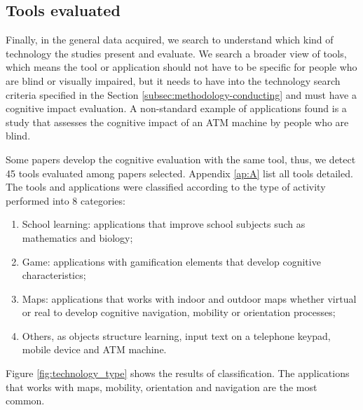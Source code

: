 \subsection{Tools evaluated}
\label{subsec:results-tools}

Finally, in the general data acquired, we search to understand which kind of technology the studies present and evaluate. We search a broader view of tools, which means the tool or application should not have to be specific for people who are blind or visually impaired, but it needs to have into the technology search criteria specified in the Section \ref{subsec:methodology-conducting} and must have a cognitive impact evaluation. A non-standard example of applications found is a study that assesses the cognitive impact of an ATM machine by people who are blind. 

Some papers develop the cognitive evaluation with the same tool, thus, we detect 45 tools evaluated among papers selected. Appendix \ref{ap:A} list all tools detailed. The tools and applications were classified according to the type of activity performed into 8 categories: 
        \begin{enumerate}
            \item School learning: applications that improve school subjects such as mathematics and biology;
            \item Game: applications with gamification elements that develop cognitive characteristics;
            \item Maps: applications that works with indoor and outdoor maps whether virtual or real to develop cognitive navigation, mobility or orientation processes;
            \item Others, as objects structure learning, input text on a telephone keypad, mobile device and ATM machine.
        \end{enumerate}

Figure \ref{fig:technology_type} shows the results of classification. The applications that works with maps, mobility, orientation and navigation are the most common.

